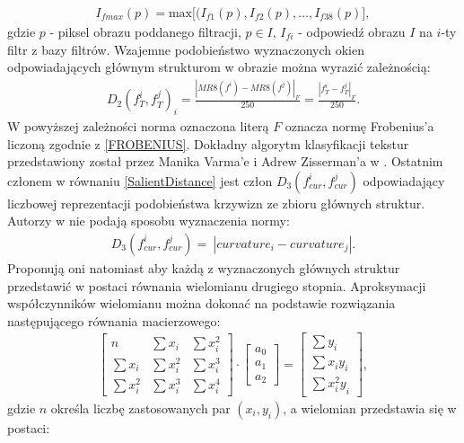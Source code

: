 \documentclass[12pt, twoside, openany]{report}
\theoremstyle{definition}
\begin{document}
\begin{align}
I_{fmax}(p)=\mathrm{max}\big[(I_{f1}(p),I_{f2}(p),\dots ,I_{f38}(p) \big],
\end{align}
gdzie $p$ - piksel obrazu poddanego filtracji, $p\in I$, $I_{fi}$ - odpowiedź obrazu $I$ na $i$-ty filtr z bazy filtrów. Wzajemne podobieństwo wyznaczonych okien odpowiadających głównym strukturom w obrazie można wyrazić zależnością:
\begin{align}
D_2{\left(f^i_T,f^j_T\right)}_i=\frac{{\left|MR8\left(f^i\right)-MR8\left(f^j\right)\right|}_F}{250}=\frac{{\left|f^i_T-f^j_T\right|}_F}{250}.
\end{align}
W powyższej zależności norma oznaczona literą $F$ oznacza normę Frobenius'a liczoną zgodnie z \eqref{FROBENIUS}.
Dokładny algorytm klasyfikacji tekstur przedstawiony został przez Manika Varma'e i Adrew Zisserman'a w \cite{varma2009statistical}. Ostatnim członem w równaniu \eqref{SalientDistance} jest człon $D_3\left(f^i_{cur},f^j_{cur}\right)$ odpowiadający liczbowej reprezentacji podobieństwa krzywizn ze zbioru głównych struktur. Autorzy w \cite{SalientStrucTexProp} nie podają sposobu wyznaczenia normy:
\begin{align}
D_3\left(f^i_{cur},f^j_{cur}\right)=\ \left|curvature_i-curvature_j\right|.
\end{align}
Proponują oni natomiast aby każdą z wyznaczonych głównych struktur przedstawić w postaci równania wielomianu drugiego stopnia. Aproksymacji współczynników wielomianu można dokonać na podstawie rozwiązania następującego równania macierzowego:
\begin{align}
\left[ \begin{array}{ccc}
n & \sum{x_i} & \sum{x^2_i} \\ 
\sum{x_i} & \sum{x^2_i} & \sum{x^3_i} \\ 
\sum{x^2_i} & \sum{x^3_i} & \sum{x^4_i} \end{array}
\right]\cdot \left[ \begin{array}{c}
a_0 \\ 
a_1 \\ 
a_2 \end{array}
\right]=\left[ \begin{array}{c}
\sum{y_i} \\ 
\sum{x_iy_i} \\ 
\sum{{x^2_iy}_i} \end{array}
\right],
\end{align}
gdzie $n$ określa liczbę zastosowanych par $(x_i,y_i)$, a wielomian przedstawia się w postaci:
\end{document}
